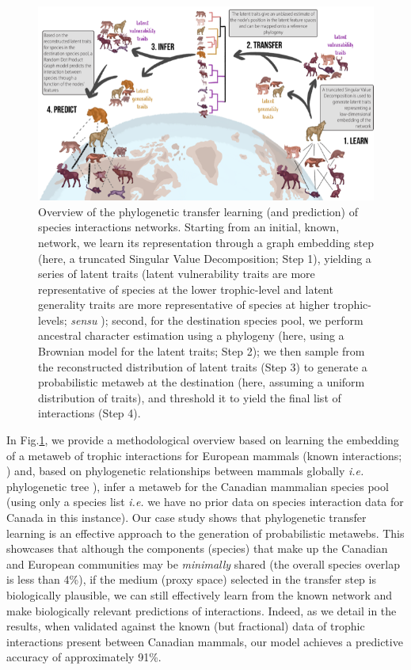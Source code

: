 \begin{figure}[h]
    \centering
    \includegraphics[width=\textwidth]{figures/figure-concept_v2.png}
    \caption{Overview of the phylogenetic transfer learning (and prediction)
of species interactions networks. Starting from an initial, known,
network, we learn its representation through a graph embedding step
(here, a truncated Singular Value Decomposition; Step 1), yielding a
series of latent traits (latent vulnerability traits are more
representative of species at the lower trophic-level and latent
generality traits are more representative of species at higher
trophic-levels; \emph{sensu} \cite{Schoener1989FooWeb}); second, for the
destination species pool, we perform ancestral character estimation
using a phylogeny (here, using a Brownian model for the latent traits;
Step 2); we then sample from the reconstructed distribution of latent
traits (Step 3) to generate a probabilistic metaweb at the destination
(here, assuming a uniform distribution of traits), and threshold it to
yield the final list of interactions (Step 4).}
    \label{fig:concept}
\end{figure}

In Fig.\ref{fig:concept}, we provide a methodological overview based on learning
the embedding of a metaweb of trophic interactions for European mammals
(known interactions; \cite{Maiorano2020TetSpe, Maiorano2020DatTet}) and,
based on phylogenetic relationships between mammals globally \emph{i.e.}
phylogenetic tree \cite{Upham2019InfMam}), infer a metaweb for the Canadian
mammalian species pool (using only a species list \emph{i.e.} we have no
prior data on species interaction data for Canada in this instance). Our
case study shows that phylogenetic transfer learning is an effective
approach to the generation of probabilistic metawebs. This showcases
that although the components (species) that make up the Canadian and
European communities may be \emph{minimally} shared (the overall species
overlap is less than 4\%), if the medium (proxy space) selected in the
transfer step is biologically plausible, we can still effectively learn
from the known network and make biologically relevant predictions of
interactions. Indeed, as we detail in the results, when validated
against the known (but fractional) data of trophic interactions present
between Canadian mammals, our model achieves a predictive accuracy of
approximately 91\%.

